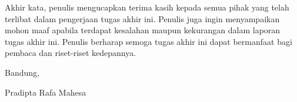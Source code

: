 Akhir kata, penulis mengucapkan terima kasih kepada semua pihak yang telah terlibat dalam pengerjaan tugas akhir ini. Penulis juga ingin menyampaikan mohon maaf apabila terdapat kesalahan maupun kekurangan dalam laporan tugas akhir ini. Penulis berharap semoga tugas akhir ini dapat bermanfaat bagi pembaca dan riset-riset kedepannya.

\begin{flushright}
	\vspace{0.5cm}
	Bandung, \tanggalpengesahan

	\vspace{1.5cm}

	Pradipta Rafa Mahesa
\end{flushright}